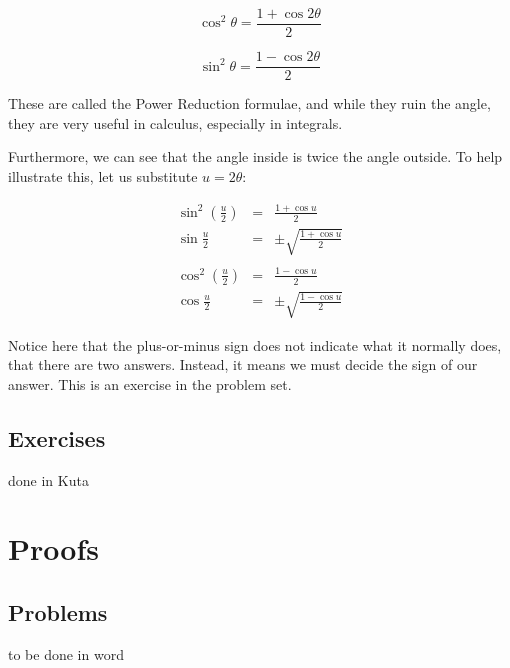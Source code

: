 \begin{equation}
\cos^2\theta = \frac{1 + \cos2\theta}{2}
\end{equation}

\begin{equation}
\sin^2\theta = \frac{1 - \cos2\theta}{2}
\end{equation}

These are called the Power Reduction formulae, and while they ruin the angle, they are very
useful in calculus, especially in integrals.

Furthermore, we can see that the angle inside is twice the angle outside.  To help illustrate this, let
us substitute $u = 2\theta$:

\begin{align*}
\sin^2\left(\frac{u}{2}\right) & = & \frac{1 + \cos u}{2} \\
\sin\frac{u}{2} &=& \pm \sqrt{\frac{1 + \cos u}{2}} \\
& & \\
\cos^2\left(\frac{u}{2}\right) & = & \frac{1 - \cos u}{2} \\
\cos\frac{u}{2} & = & \pm \sqrt{\frac{1 - \cos u }{2}}
\end{align*}

Notice here that the plus-or-minus sign does not indicate what it normally does, that there are
two answers.  Instead, it means we must decide the sign of our answer.  This is an exercise
in the problem set.

\newpage
\subsection{Exercises}
done in Kuta


\newpage
\section{Proofs}
\subsection{Problems}
to be done in word
\newpage
